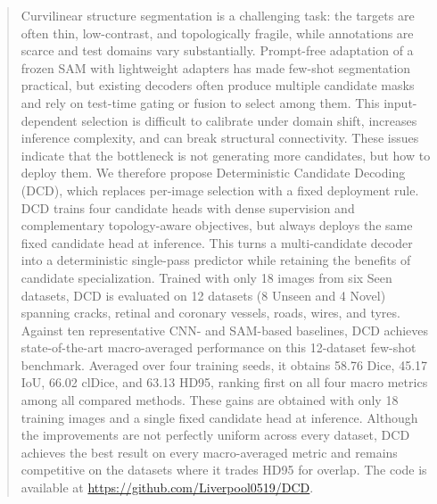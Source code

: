 \begin{abstract}
Curvilinear structure segmentation is a challenging task: the targets are
often thin, low-contrast, and topologically fragile, while annotations are
scarce and test domains vary substantially.  Prompt-free adaptation of a
frozen SAM with lightweight adapters has made few-shot segmentation
practical, but existing decoders often produce multiple candidate masks and
rely on test-time gating or fusion to select among them.  This
input-dependent selection is difficult to calibrate under domain shift,
increases inference complexity, and can break structural connectivity.
These issues indicate that the bottleneck is not generating more
candidates, but how to deploy them.  We therefore propose Deterministic
Candidate Decoding (DCD), which replaces per-image selection with a fixed
deployment rule.  DCD trains four candidate heads with dense supervision
and complementary topology-aware objectives, but always deploys the same
fixed candidate head at inference.  This turns a multi-candidate decoder
into a deterministic single-pass predictor while retaining the benefits of
candidate specialization.  Trained with only 18 images from six Seen
datasets, DCD is evaluated on 12 datasets (8 Unseen and 4 Novel) spanning
cracks, retinal and coronary vessels, roads, wires, and tyres.  Against ten
representative CNN- and SAM-based baselines, DCD achieves
state-of-the-art macro-averaged performance on this 12-dataset few-shot
benchmark.  Averaged over four training seeds, it obtains 58.76 Dice,
45.17 IoU, 66.02 clDice, and 63.13 HD95, ranking first on all four macro
metrics among all compared methods.  These gains are obtained with only 18
training images and a single fixed candidate head at inference.  Although
the improvements are not perfectly uniform across every dataset, DCD
achieves the best result on every macro-averaged metric and remains
competitive on the datasets where it trades HD95 for overlap.
The code is available at \textcolor{cvprblue}{\url{https://github.com/Liverpool0519/DCD}}.
\end{abstract}
